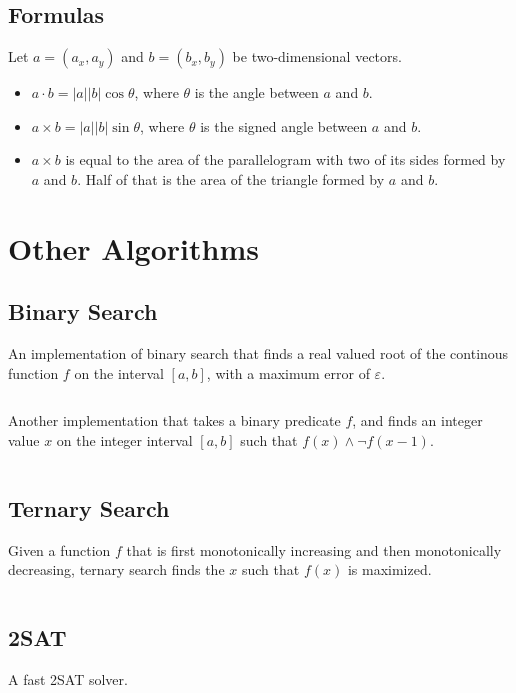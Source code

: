 \documentclass[9pt,a4paper,twocolumn,landscape,oneside]{amsart}
\newcommand{\code}[1]{\inputminted{cpp}{_code/#1}}
\begin{document}
    \subsection{Formulas}
        Let $a = (a_x, a_y)$ and $b = (b_x, b_y)$ be two-dimensional vectors.
        \begin{itemize}
            \item $a\cdot b = |a||b|\cos{\theta}$, where $\theta$ is the angle
                between $a$ and $b$.
            \item $a\times b = |a||b|\sin{\theta}$, where $\theta$ is the
                signed angle between $a$ and $b$.
            \item $a\times b$ is equal to the area of the parallelogram with
                two of its sides formed by $a$ and $b$. Half of that is the
                area of the triangle formed by $a$ and $b$.
        \end{itemize}


\section{Other Algorithms}
    \subsection{Binary Search}
        An implementation of binary search that finds a real valued root of the
        continous function $f$ on the interval $[a,b]$, with a maximum error of
        $\varepsilon$.
        \code{other/binary_search_continuous.cpp}

        Another implementation that takes a binary predicate $f$, and finds an
        integer value $x$ on the integer interval $[a,b]$ such that $f(x) \land
        \lnot f(x - 1)$.
        \code{other/binary_search_discrete.cpp}

    \subsection{Ternary Search}
        Given a function $f$ that is first monotonically increasing and then
        monotonically decreasing, ternary search finds the $x$ such that $f(x)$ is
        maximized.
        \code{other/ternary_search_continuous.cpp}

    \subsection{2SAT}
        A fast 2SAT solver.
        \code{other/two_sat.cpp}
\end{document}
